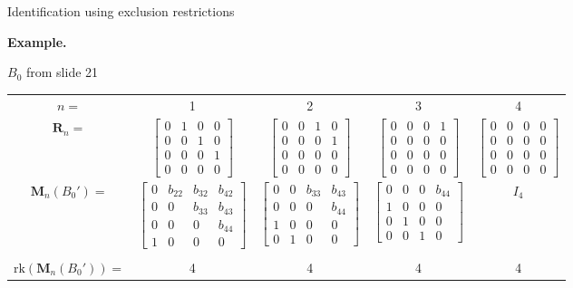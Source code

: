 \documentclass[notes,blackandwhite,mathsans,usenames,dvipsnames]{beamer}
\begin{document}
\begin{frame}{Identification using exclusion restrictions}

\textbf{Example.}

 $B_0$ {\color{mcxs2}from slide 21}
\tiny
\begin{center}
\begin{tabular}{ccccc}
$n=$&1&2&3&4\\[2ex]
$\mathbf{R}_n=$&$\begin{bmatrix} 0&1&0&0\\0&0&1&0\\0&0&0&1\\0&0&0&0 \end{bmatrix}$&
$\begin{bmatrix} 0&0&1&0\\0&0&0&1\\0&0&0&0\\0&0&0&0 \end{bmatrix}$&
$\begin{bmatrix} 0&0&0&1\\0&0&0&0\\0&0&0&0\\0&0&0&0 \end{bmatrix}$&
$\begin{bmatrix} 0&0&0&0\\0&0&0&0\\0&0&0&0\\0&0&0&0 \end{bmatrix}$\\[5ex]
$\mathbf{M}_n(B_0')=$&
$\begin{bmatrix} 0&b_{22}&b_{32}&b_{42}\\0&0&b_{33}&b_{43}\\0&0&0&b_{44}\\1&0&0&0 \end{bmatrix}$&
$\begin{bmatrix} 0&0&b_{33}&b_{43}\\0&0&0&b_{44}\\1&0&0&0\\0&1&0&0 \end{bmatrix}$&
$\begin{bmatrix} 0&0&0&b_{44}\\1&0&0&0\\0&1&0&0\\0&0&1&0 \end{bmatrix}$&
$I_4$\\
&&&&\\
$\text{rk}(\mathbf{M}_n(B_0'))=$&4&4&4&4
\end{tabular}
\end{center}

\normalsize
{}

\end{frame}
\end{document}
